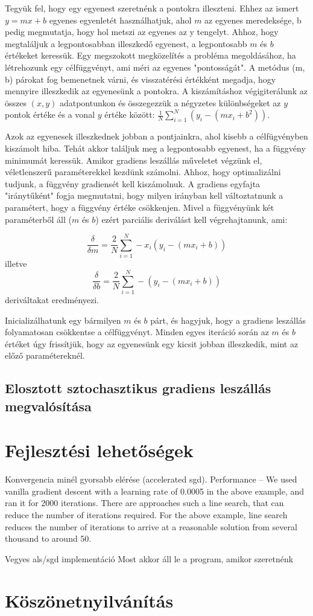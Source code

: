 \documentclass[a4paper,12pt]{article}
\begin{document}
Tegyük fel, hogy egy egyenest szeretnénk a pontokra illeszteni.  Ehhez az ismert $y = mx + b$ egyenes egyenletét használhatjuk, ahol $m$ az egyenes meredeksége, b pedig megmutatja, hogy hol metszi az egyenes az y tengelyt. Ahhoz, hogy megtaláljuk a legpontosabban illeszkedő egyenest, a legpontosabb $m$ és $b$ értékeket keressük.
Egy megszokott megközelítés a probléma megoldásához, ha létrehozunk egy célfüggvényt, ami méri az egyenes "pontosságát". A metódus (m, b) párokat fog bemenetnek várni, és visszatérési értékként megadja, hogy mennyire illeszkedik az egyenesünk a pontokra. A kiszámításhoz végigiterálunk az összes $(x, y)$ adatpontunkon és összegezzük a négyzetes különbségeket az $y$ pontok értéke és a vonal $y$ értéke között: $ \frac{1}{N} \sum_{i=1}^{N} (y_{i} - (m x_{i} + b^2))$.

Azok az egyenesek illeszkednek jobban a pontjainkra, ahol kisebb a célfügvényben kiszámolt hiba. Tehát akkor találjuk meg a legpontosabb egyenest, ha a függvény minimumát keressük.
Amikor gradiens leszállás műveletet végzünk el, véletlenszerű paraméterekkel kezdünk számolni. Ahhoz, hogy optimalizálni tudjunk, a függvény gradiensét kell kiszámolnuk. A gradiens egyfajta "iránytűként" fogja megmutatni, hogy milyen irányban kell változtatnunk a paramétert, hogy a függvény értéke csökkenjen. Mivel a függvényünk két paraméterből áll ($m$ és $b$) ezért parciális deriválást kell végrehajtanunk, ami:

\[\frac{ \delta }{ \delta m} =  \frac{2}{N}  \sum_{i=1}^{N} -x_{i} (y_{i} - (mx_{i} + b))\] illetve 
\[\frac{ \delta }{ \delta b} =  \frac{2}{N}  \sum_{i=1}^{N} - (y_{i} - (mx_{i} + b))\] deriváltakat eredményezi.

Inicializálhatunk egy bármilyen $m$ és $b$ párt, és hagyjuk, hogy a gradiens leszállás folyamatosan csökkentse a célfüggvényt. Minden egyes iteráció során az $m$ és $b$ értéket úgy frissítjük, hogy az egyenesünk egy kicsit jobban illeszkedik, mint az előző paramétereknél. 

\subsection{Elosztott sztochasztikus gradiens leszállás megvalósítása}


\newpage
\section{Fejlesztési lehetőségek}	

Konvergencia minél gyorsabb elérése (accelerated sgd). 
Performance – We used vanilla gradient descent with a learning rate of 0.0005 in the above example, and ran it for 2000 iterations. There are approaches such a line search, that can reduce the number of iterations required. For the above example, line search reduces the number of iterations to arrive at a reasonable solution from several thousand to around 50.

Vegyes als/sgd implementáció
Most akkor áll le a program, amikor szeretnénk

\section{Köszönetnyilvánítás}	


\newpage

\printbibliography
\end{document}
